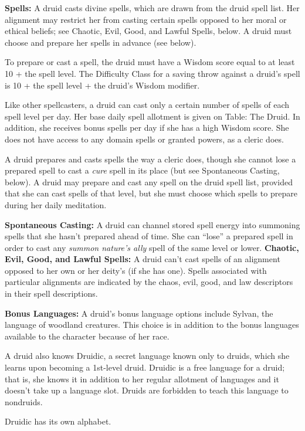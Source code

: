 \documentclass{article}
\begin{document}
\textbf{Spells:} A druid casts divine spells, which are drawn from the druid spell 
list. Her alignment may restrict her from casting certain spells opposed to her 
moral or ethical beliefs; see Chaotic, Evil, Good, and Lawful Spells, below. A 
druid must choose and prepare her spells in advance (see below).

To prepare or cast a spell, the druid must have a Wisdom score equal to at least 
10 + the spell level. The Difficulty Class for a saving throw against a druid's 
spell is 10 + the spell level + the druid's Wisdom modifier.

Like other spellcasters, a druid can cast only a certain number of spells of each 
spell level per day. Her base daily spell allotment is given on Table: The Druid. 
In addition, she receives bonus spells per day if she has a high Wisdom score. 
She does not have access to any domain spells or granted powers, as a cleric does.

A druid prepares and casts spells the way a cleric does, though she cannot lose 
a prepared spell to cast a \textit{cure }spell in its place (but see Spontaneous 
Casting, below). A druid may prepare and cast any spell on the druid spell list, 
provided that she can cast spells of that level, but she must choose which spells 
to prepare during her daily meditation.

\textbf{Spontaneous Casting:} A druid can channel stored spell energy into summoning 
spells that she hasn't prepared ahead of time. She can ``lose'' a prepared spell 
in order to cast any \textit{summon nature's ally }spell of the same level or lower.\textbf{ 
Chaotic, Evil, Good, and Lawful Spells:} A druid can't cast spells of an alignment 
opposed to her own or her deity's (if she has one). Spells associated with particular 
alignments are indicated by the chaos, evil, good, and law descriptors in their 
spell descriptions.

\textbf{Bonus Languages:} A druid's bonus language options include Sylvan, the 
language of woodland creatures. This choice is in addition to the bonus languages 
available to the character because of her race.

A druid also knows Druidic, a secret language known only to druids, which she learns 
upon becoming a 1st-level druid. Druidic is a free language for a druid; that is, 
she knows it in addition to her regular allotment of languages and it doesn't take 
up a language slot. Druids are forbidden to teach this language to nondruids.

Druidic has its own alphabet.
\end{document}
